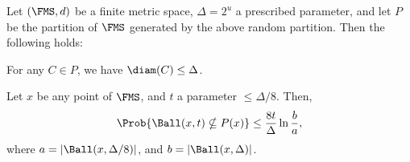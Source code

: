 \begin{lemma}
    Let $(\FMS,d)$ be a finite metric space, $\Delta = 2^u$ a prescribed
    parameter, and let $P$ be the partition of $\FMS$ generated by the
    above random partition. Then the following holds:
    \begin{compactenumi}
        \item For any $C \in P$, we have $\diam(C) \leq \Delta$.
    
        \item Let $x$ be any point of $\FMS$, and $t$ a parameter $\leq
        \Delta/8$.  Then,
        \begin{equation*}
            \Prob{\bigl. \Ball(x,t) \nsubseteq P(x)}%
            \leq%
            \frac{8t}{\Delta} \ln \frac{b}{a},
        \end{equation*}
        where $a = |\Ball(x, \Delta/8)|$, and
        $b = |\Ball(x, \Delta)|$.
    \end{compactenumi}
\end{lemma}
